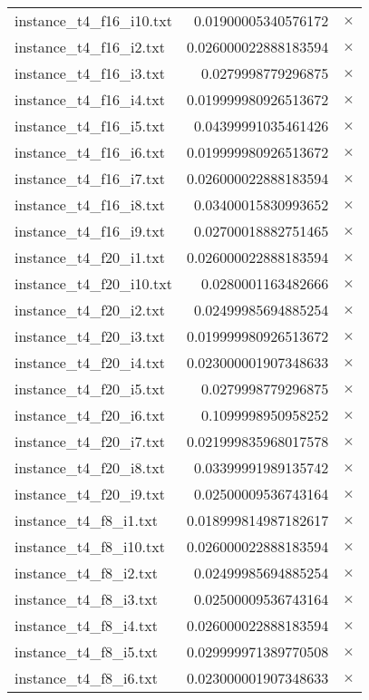 \documentclass{article}
\begin{document}
\begin{center}
\begin{tabular}{|l|rr|}
instance\_t4\_f16\_i10.txt & 0.01900005340576172 & $\times$ \\
instance\_t4\_f16\_i2.txt & 0.026000022888183594 & $\times$ \\
instance\_t4\_f16\_i3.txt & 0.0279998779296875 & $\times$ \\
instance\_t4\_f16\_i4.txt & 0.019999980926513672 & $\times$ \\
instance\_t4\_f16\_i5.txt & 0.04399991035461426 & $\times$ \\
instance\_t4\_f16\_i6.txt & 0.019999980926513672 & $\times$ \\
instance\_t4\_f16\_i7.txt & 0.026000022888183594 & $\times$ \\
instance\_t4\_f16\_i8.txt & 0.03400015830993652 & $\times$ \\
instance\_t4\_f16\_i9.txt & 0.02700018882751465 & $\times$ \\
instance\_t4\_f20\_i1.txt & 0.026000022888183594 & $\times$ \\
instance\_t4\_f20\_i10.txt & 0.0280001163482666 & $\times$ \\
instance\_t4\_f20\_i2.txt & 0.02499985694885254 & $\times$ \\
instance\_t4\_f20\_i3.txt & 0.019999980926513672 & $\times$ \\
instance\_t4\_f20\_i4.txt & 0.023000001907348633 & $\times$ \\
instance\_t4\_f20\_i5.txt & 0.0279998779296875 & $\times$ \\
instance\_t4\_f20\_i6.txt & 0.1099998950958252 & $\times$ \\
instance\_t4\_f20\_i7.txt & 0.021999835968017578 & $\times$ \\
instance\_t4\_f20\_i8.txt & 0.03399991989135742 & $\times$ \\
instance\_t4\_f20\_i9.txt & 0.02500009536743164 & $\times$ \\
instance\_t4\_f8\_i1.txt & 0.018999814987182617 & $\times$ \\
instance\_t4\_f8\_i10.txt & 0.026000022888183594 & $\times$ \\
instance\_t4\_f8\_i2.txt & 0.02499985694885254 & $\times$ \\
instance\_t4\_f8\_i3.txt & 0.02500009536743164 & $\times$ \\
instance\_t4\_f8\_i4.txt & 0.026000022888183594 & $\times$ \\
instance\_t4\_f8\_i5.txt & 0.029999971389770508 & $\times$ \\
instance\_t4\_f8\_i6.txt & 0.023000001907348633 & $\times$ \\

\end{tabular}
\end{center}
\end{document}
